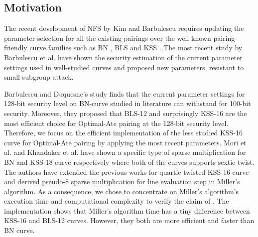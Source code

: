 \subsection{Motivation}
The recent development of NFS by Kim and Barbulescu \cite{C:KimBar16} requires updating the parameter selection for all the existing pairings over the well known pairing-friendly curve families such as BN \cite{SAC:BarNae05}, BLS \cite{EPRINT:FreScoTes06} and KSS \cite{EPRINT:KacSchSco07}.
The most recent study by Barbulescu et al. \cite{EPRINT:BarDuq17} have shown the security estimation of the current parameter settings used in well-studied curves and proposed new parameters, resistant to small subgroup attack.

Barbulescu and Duquesne's study finds that the current parameter settings for 128-bit security level on BN-curve studied in literature can withstand for 100-bit security. 
Moreover, they proposed that BLS-12 and surprisingly KSS-16 are the most efficient choice for Optimal-Ate pairing at the 128-bit security level. Therefore, we focus on the efficient implementation of the less studied KSS-16 curve for Optimal-Ate pairing by applying the most recent parameters.
Mori et al. \cite{PAIRING:MANS13} and Khandaker et al. \cite{ICISC:KONSD16} have shown a specific type of sparse multiplication for BN and KSS-18 curve respectively where both of the curves supports sextic twist. 
The authors have extended the previous works for quartic twisted KSS-16 curve and derived pseudo-8 sparse multiplication for line evaluation step in Miller's algorithm. 
As a consequence, we chose to concentrate on Miller's algorithm's execution time and computational complexity to verify the claim of \cite{EPRINT:BarDuq17}.
The implementation shows that Miller's algorithm time has a tiny difference between KSS-16 and BLS-12 curves. However, they both are more efficient and faster than BN curve. 

